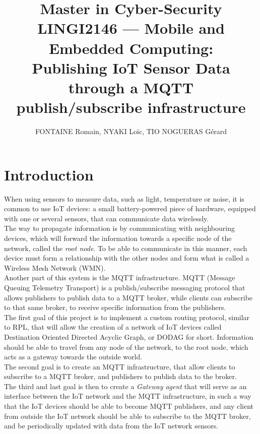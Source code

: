 \documentclass[a4paper,11pt]{article}
\title{Master in Cyber-Security\\
	LINGI2146 --- Mobile and Embedded Computing: \\
	Publishing IoT Sensor Data through a MQTT publish/subscribe infrastructure}
\author{FONTAINE Romain, NYAKI Loïc, TIO NOGUERAS Gérard}
\begin{document}
\maketitle
\newpage
\tableofcontents

\newpage

\section{Introduction}
When using sensors to measure data, such as light, temperature or noise, it is common to use IoT devices: a small battery-powered piece of hardware, equipped with one or several sensors, that can communicate data wirelessly.\\

The way to propagate information is by communicating with neighbouring devices, which will forward the information towards a specific node of the network, called the \textit{root node}. To be able to communicate in this manner, each device must form a relationship with the other nodes and form what is called a Wireless Mesh Network (WMN).\\

Another part of this system is the MQTT infrastructure. MQTT (Message Queuing Telemetry Transport) is a publish/subscribe messaging protocol that allows publishers to publish data to a MQTT broker, while clients can subscribe to that same broker, to receive specific information from the publishers.\\

The first goal of this project is to implement a custom routing protocol, similar to RPL,  that will allow the creation of a network of IoT devices called  Destination Oriented Directed Acyclic Graph, or DODAG for short. Information should be able to travel from any node of the network, to the root node, which acts as a gateway towards the outside world. \\

The second goal is to create an MQTT infrastructure, that allow clients to subscribe to a MQTT broker, and publishers to publish data to the broker.\\

The third and last goal is then to create a \textit{Gateway agent} that will serve as an interface between the IoT network and the MQTT infrastructure, in such a way that the IoT devices should be able to become MQTT publishers, and any client from outside the IoT network should be able to subscribe to the MQTT broker, and be periodically updated with data from the IoT network sensors.
\end{document}
